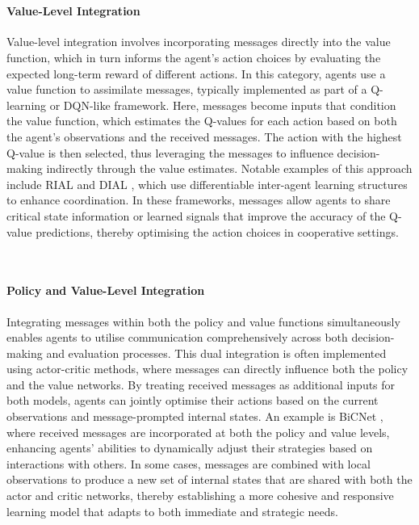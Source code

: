 \documentclass{article}
\begin{document}
\

\paragraph{Value-Level Integration}
Value-level integration involves incorporating messages directly into the value function, which in turn informs the agent’s action choices by evaluating the expected long-term reward of different actions. In this category, agents use a value function to assimilate messages, typically implemented as part of a Q-learning or DQN-like framework. Here, messages become inputs that condition the value function, which estimates the Q-values for each action based on both the agent’s observations and the received messages. The action with the highest Q-value is then selected, thus leveraging the messages to influence decision-making indirectly through the value estimates. Notable examples of this approach include RIAL and DIAL \citep{foerster2016learning}, which use differentiable inter-agent learning structures to enhance coordination. In these frameworks, messages allow agents to share critical state information or learned signals that improve the accuracy of the Q-value predictions, thereby optimising the action choices in cooperative settings.

\

\paragraph{Policy and Value-Level Integration}
Integrating messages within both the policy and value functions simultaneously enables agents to utilise communication comprehensively across both decision-making and evaluation processes. This dual integration is often implemented using actor-critic methods, where messages can directly influence both the policy and the value networks. By treating received messages as additional inputs for both models, agents can jointly optimise their actions based on the current observations and message-prompted internal states. An example is BiCNet \citep{peng2017bicnet}, where received messages are incorporated at both the policy and value levels, enhancing agents’ abilities to dynamically adjust their strategies based on interactions with others. In some cases, messages are combined with local observations to produce a new set of internal states that are shared with both the actor and critic networks, thereby establishing a more cohesive and responsive learning model that adapts to both immediate and strategic needs.
\end{document}

